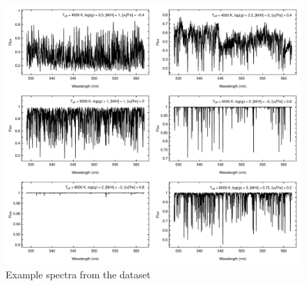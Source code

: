 \documentclass[a4paper,fleqn,usenatbib]{mnras}
\begin{document}
{\begin{figure}
\centering\includegraphics[width=\textwidth]{espectros.pdf}
\caption{Example spectra from the dataset}
\label{fig:ejemplosEspectros}
\end{figure}

%

}
\end{document}
